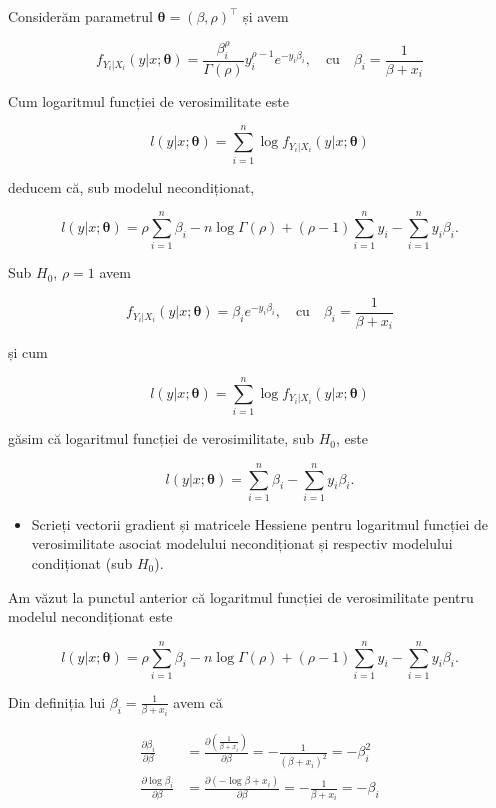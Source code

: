\documentclass[]{article}
\newenvironment{frshaded*}{%
  \def\FrameCommand{\fboxrule=\FrameRule\fboxsep=\FrameSep \fcolorbox{framecolor}{shadecolor1}}%
  \MakeFramed {\advance\hsize-\width \FrameRestore}}%
{\endMakeFramed}
\newenvironment{rmdblock}[1]
  {\begin{frshaded*}
  \begin{itemize}
  \renewcommand{\labelitemi}{
    \raisebox{-.7\height}[0pt][0pt]{
      {\setkeys{Gin}{width=2em,keepaspectratio}\texttt{[image: images/icons/\#1]}}
    }
  }
  \item
  }
  {
  \end{itemize}
  \end{frshaded*}
  }
\newenvironment{rmdexercise}
  {\begin{rmdblock}{exercise}}
  {\end{rmdblock}}
\begin{document}
Considerăm parametrul \(\mathbf{\theta} = (\beta, \rho)^\intercal\) și
avem

\[
 f_{Y_i|X_i}(y|x;\mathbf{\theta}) = \frac{\beta_i^{\rho}}{\Gamma(\rho)}y_i^{\rho - 1}e^{-y_i\beta_i},\quad \text{cu}\quad  \beta_i = \frac{1}{\beta+x_i}
\]

Cum logaritmul funcției de verosimilitate este

\[
  l(y|x;\mathbf{\theta}) = \sum_{i = 1}^{n} \log{ f_{Y_i|X_i}(y|x;\mathbf{\theta})}
\]

deducem că, sub modelul necondiționat,

\[
  l(y|x;\mathbf{\theta}) = \rho\sum_{i = 1}^{n}\beta_i - n\log{\Gamma(\rho)} + (\rho - 1)\sum_{i = 1}^{n}y_i - \sum_{i = 1}^{n}y_i\beta_i.
\]

Sub \(H_0\), \(\rho = 1\) avem

\[
f_{Y_i|X_i}(y|x;\mathbf{\theta}) = \beta_i e^{-y_i\beta_i},\quad \text{cu}\quad  \beta_i = \frac{1}{\beta+x_i}
\]

și cum

\[
  l(y|x;\mathbf{\theta}) = \sum_{i = 1}^{n} \log{ f_{Y_i|X_i}(y|x;\mathbf{\theta})}
\]

găsim că logaritmul funcției de verosimilitate, sub \(H_0\), este

\[
  l(y|x;\mathbf{\theta}) = \sum_{i = 1}^{n}\beta_i - \sum_{i = 1}^{n}y_i\beta_i.
\]

\begin{rmdexercise}
Scrieți vectorii gradient și matricele Hessiene pentru logaritmul
funcției de verosimilitate asociat modelului necondiționat și respectiv
modelului condiționat (sub \(H_0\)).
\end{rmdexercise}

Am văzut la punctul anterior că logaritmul funcției de verosimilitate
pentru modelul necondiționat este

\[
  l(y|x;\mathbf{\theta}) = \rho\sum_{i = 1}^{n}\beta_i - n\log{\Gamma(\rho)} + (\rho - 1)\sum_{i = 1}^{n}y_i - \sum_{i = 1}^{n}y_i\beta_i.
\]

Din definiția lui \(\beta_i = \frac{1}{\beta+x_i}\) avem că

\begin{align*}
  \frac{\partial\beta_i}{\partial \beta} &= \frac{\partial\left(\frac{1}{\beta+x_i}\right)}{\partial \beta} = -\frac{1}{(\beta + x_i)^2} = -\beta_i^2\\
  \frac{\partial\log{\beta_i}}{\partial \beta} &= \frac{\partial(-\log{\beta+x_i})}{\partial \beta} = -\frac{1}{\beta + x_i} = -\beta_i
\end{align*}
\end{document}
